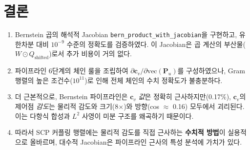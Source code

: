 \documentclass[11pt]{article}
\begin{document}
\section{결론}

\begin{enumerate}
  \item Bernstein 곱의 해석적 Jacobian
        \texttt{bern\_product\_with\_jacobian}을 구현하고,
        유한차분 대비 $10^{-9}$ 수준의 정확도를 검증하였다.
        이 Jacobian은 곱 계산의 부산물($W \odot Q_{\mathrm{shifted}}$)로서
        추가 비용이 거의 없다.

  \item 파이프라인 6단계의 체인 룰을 조립하여
        $\partial\mathbf{c}_v/\partial\text{vec}(\mathbf{P}_u)$를 구성하였으나,
        Gram 행렬의 높은 조건수($10^{11}$)로 인해
        전체 체인의 수치 정확도가 불충분하다.

  \item 더 근본적으로, Bernstein 파이프라인은
        $\mathbf{c}_v$ \emph{값}은 정확히 근사하지만(0.17\%),
        $\mathbf{c}_v$의 제어점 \emph{감도}는 물리적 감도와
        크기(8$\times$)와 방향(cos $\approx$ 0.16) 모두에서 괴리된다.
        이는 다항식 합성과 $L^2$ 사영이 미분 구조를 왜곡하기 때문이다.

  \item 따라서 SCP 커플링 행렬에는
        물리적 감도를 직접 근사하는 \textbf{수치적 방법}이 실용적으로 올바르며,
        대수적 Jacobian은 파이프라인 근사의 특성 분석에 가치가 있다.
\end{enumerate}



\end{document}

